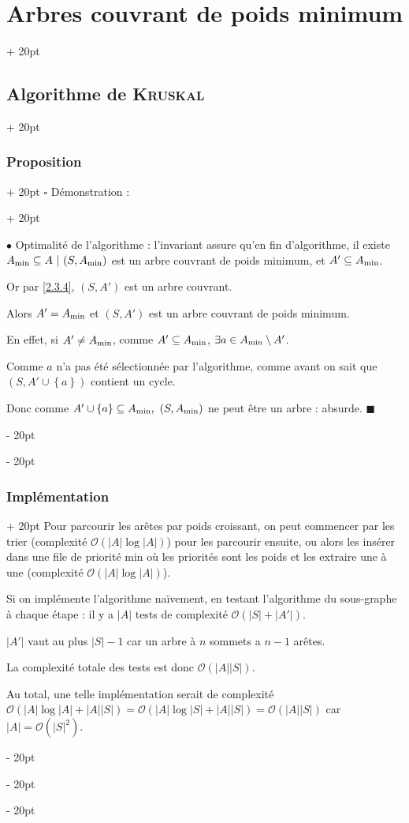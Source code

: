 \documentclass[a4paper, 12pt, twoside]{article}
\newcommand{\set}[1]{\left\{ #1 \right\}}
\newcommand{\abs}[1]{\left\lvert #1 \right\rvert}
\newcommand{\ind}[1][20pt]{\advance\leftskip + #1}
\newcommand{\deind}[1][20pt]{\advance\leftskip - #1}
\newenvironment{indt}[2][20pt]{#2 \par \ind[#1]}{\par \deind} %
\newenvironment{proof}[1][{Démonstration :}]{\begin{indt}{$\square$ #1}}{$\blacksquare$ \end{indt}}
\begin{document}
\begin{indt}{\section{Arbres couvrant de poids minimum}}
\begin{indt}{\subsection{Algorithme de \textsc{Kruskal}}}
\begin{indt}{\subsubsection{Proposition}}
\begin{proof}
                    \vspace{12pt}
                    
                    $\bullet$ Optimalité de l'algorithme : l'invariant assure qu'en fin d'algorithme, il existe $A_{\rm min} \subseteq A\ |\ (S, A_{\rm min})$ est un arbre couvrant de poids minimum, et $A' \subseteq A_{\rm min}$.

                    Or par \ref{2.3.4}, $(S, A')$ est un arbre couvrant.

                    Alors $A' = A_{\rm min}$ et $(S, A')$ est un arbre couvrant de poids minimum.

                    En effet, si $A' \neq A_{\rm min}$, comme $A' \subseteq A_{\rm min}$, $\exists a \in A_{\rm min} \setminus A'$.

                    Comme $a$ n'a pas été sélectionnée par l'algorithme, comme avant on sait que $(S, A' \cup \set a)$ contient un cycle.

                    Donc comme $A' \cup \set a \subseteq A_{\rm min},\ (S, A_{\rm min})$ ne peut être un arbre : absurde.
                \end{proof}
            \end{indt}

            \begin{indt}{\subsubsection{Implémentation}}
                Pour parcourir les arêtes par poids croissant, on peut commencer par les trier (complexité $\mathcal O(\abs A \log \abs A)$) pour les parcourir ensuite, ou alors les insérer dans une file de priorité min où les priorités sont les poids et les extraire une à une (complexité $\mathcal O(\abs A \log \abs A)$).

                Si on implémente l'algorithme naïvement, en testant l'algorithme du sous-graphe à chaque étape : il y a $\abs A$ tests de complexité $\mathcal O(\abs S + \abs{A'})$.

                $\abs{A'}$ vaut au plus $\abs S - 1$ car un arbre à $n$ sommets a $n - 1$ arêtes.

                La complexité totale des tests est donc $\mathcal O(\abs A \abs S)$.

                Au total, une telle implémentation serait de complexité $\mathcal O(\abs A \log \abs A + \abs A \abs S) = \mathcal O(\abs A \log \abs S + \abs A \abs S) = \mathcal O(\abs A \abs S)$ car $\abs A = \mathcal O(\abs S ^2)$.


\end{indt}
\end{indt}
\end{indt}
\end{document}
